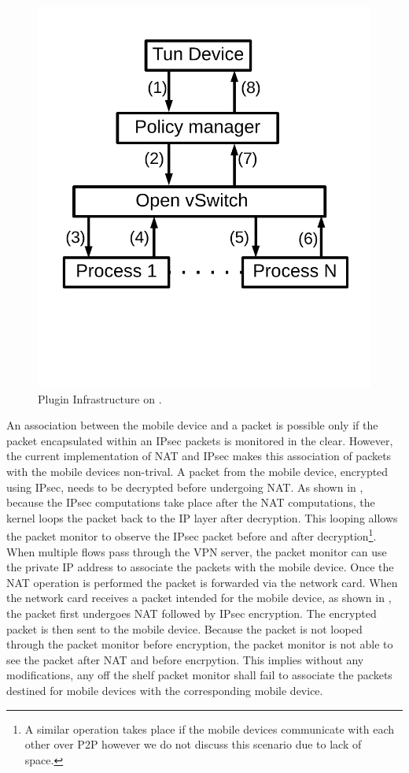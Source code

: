 \begin{figure}
\begin{center}
\includegraphics[width=0.8\columnwidth]{figures/packet-monitoring-plugin.pdf}
\end{center}
\caption{Plugin Infrastructure on \platname.}
\label{fig:packet-monitoring-solution}
\end{figure}


An association between the mobile device and a packet is possible only
if the packet encapsulated within an IPsec packets is monitored in the
clear.  However, the current implementation of NAT and IPsec makes
this association of packets with the mobile devices non-trival.  A
packet from the mobile device, encrypted using IPsec, needs to be
decrypted before undergoing NAT.  As shown in
, because the IPsec computations
take place after the NAT computations, the kernel loops the packet
back to the IP layer after decryption.  This looping allows the packet
monitor to observe the IPsec packet before and after
decryption\footnote{A similar operation takes place if the mobile
  devices communicate with each other over P2P however we do not
  discuss this scenario due to lack of space.}.  When multiple flows
pass through the VPN server, the packet monitor can use the private IP
address to associate the packets with the mobile device.  Once the NAT
operation is performed the packet is forwarded via the network card.
When the network card receives a packet intended for the mobile
device, as shown in , the packet
first undergoes NAT followed by IPsec encryption.  The encrypted
packet is then sent to the mobile device.  Because the packet is not
looped through the packet monitor before encryption, the packet
monitor is not able to see the packet after NAT and before encrpytion.
This implies without any modifications, any off the shelf packet
monitor shall fail to associate the packets destined for mobile
devices with the corresponding mobile device.

